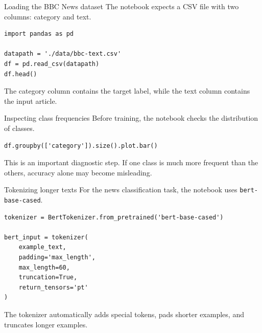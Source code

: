 \documentclass[aspectratio=169]{beamer}
\begin{document}
\begin{frame}[fragile]{Loading the BBC News dataset}
The notebook expects a CSV file with two columns: category and text.

\begin{lstlisting}[style=pythonstyle]
import pandas as pd

datapath = './data/bbc-text.csv'
df = pd.read_csv(datapath)
df.head()
\end{lstlisting}

\vspace{0.2cm}

The category column contains the target label, while the text column contains the input article.
\end{frame}

\begin{frame}[fragile]{Inspecting class frequencies}
Before training, the notebook checks the distribution of classes.

\begin{lstlisting}[style=pythonstyle]
df.groupby(['category']).size().plot.bar()
\end{lstlisting}

\vspace{0.3cm}

This is an important diagnostic step. If one class is much more frequent than the others, accuracy alone may become misleading.
\end{frame}

\begin{frame}[fragile]{Tokenizing longer texts}
For the news classification task, the notebook uses \texttt{bert-base-cased}.

\begin{lstlisting}[style=pythonstyle]
tokenizer = BertTokenizer.from_pretrained('bert-base-cased')

bert_input = tokenizer(
    example_text,
    padding='max_length',
    max_length=60,
    truncation=True,
    return_tensors='pt'
)
\end{lstlisting}

\vspace{0.2cm}

The tokenizer automatically adds special tokens, pads shorter examples, and truncates longer examples.
\end{frame}
\end{document}
